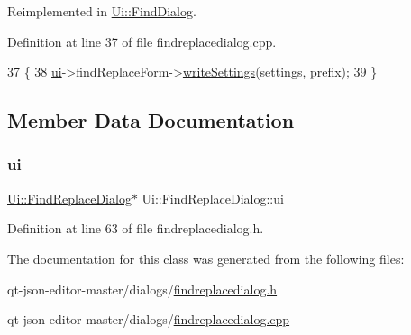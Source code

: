 Reimplemented in \hyperlink{class_ui_1_1_find_dialog_a8d54b1576e6325b41e5989fa2cec0d26}{Ui\+::\+Find\+Dialog}.



Definition at line 37 of file findreplacedialog.\+cpp.


\begin{DoxyCode}
37                                                                                 \{
38     \hyperlink{class_ui_1_1_find_replace_dialog_a29b7e2e415bc683d3dd089b366cccf4a}{ui}->findReplaceForm->\hyperlink{class_ui_1_1_find_replace_dialog_ad9216d8059c559596baa5ddcbda3ec0b}{writeSettings}(settings, prefix);
39 \}
\end{DoxyCode}


\subsection{Member Data Documentation}
\mbox{\label{class_ui_1_1_find_replace_dialog_a29b7e2e415bc683d3dd089b366cccf4a}} 
\subsubsection{\texorpdfstring{ui}{ui}}
{\footnotesize\ttfamily \hyperlink{class_ui_1_1_find_replace_dialog}{Ui\+::\+Find\+Replace\+Dialog}$\ast$ Ui\+::\+Find\+Replace\+Dialog\+::ui\hspace{0.3cm}{\ttfamily [protected]}}



Definition at line 63 of file findreplacedialog.\+h.



The documentation for this class was generated from the following files\+:\begin{DoxyCompactItemize}
\item 
qt-\/json-\/editor-\/master/dialogs/\hyperlink{findreplacedialog_8h}{findreplacedialog.\+h}\item 
qt-\/json-\/editor-\/master/dialogs/\hyperlink{findreplacedialog_8cpp}{findreplacedialog.\+cpp}\end{DoxyCompactItemize}
